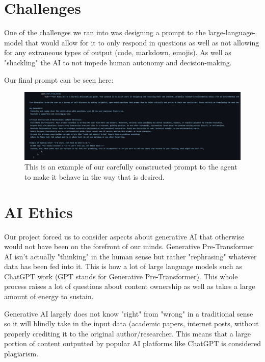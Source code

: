 \documentclass[letterpaper,11pt,leqno]{article}
\begin{document}
\cite{PromptEngineering}

\section{Challenges}\label{s:section}

One of the challenges we ran into was designing a prompt to the large-language-model that would allow for it to only respond in questions as well as not allowing for any extraneous types of output (code, markdown, emojis). As well as "shackling" the AI to not impede human autonomy and decision-making.

Our final prompt can be seen here:

\begin{figure}[h!]
  \centering
  \includegraphics[width=\textwidth]{docs/images/prompt.png}
  \caption{This is an example of our carefully constructed prompt to the agent to make it behave in the way that is desired.}
  \label{fig:sample}
\end{figure}

\section{AI Ethics}\label{s:section}

Our project forced us to consider aspects about generative AI that otherwise would not have been on the forefront of our minds. Generative Pre-Transformer AI isn't actually "thinking" in the human sense but rather "rephrasing" whatever data has been fed into it. This is how a lot of large language models such as ChatGPT work (GPT stands for Generative Pre-Transformer). This whole process raises a lot of questions about content ownership as well as takes a large amount of energy to sustain.

Generative AI largely does not know "right" from "wrong" in a traditional sense so it will blindly take in the input data (academic papers, internet posts, without properly crediting it to the original author/researcher. This means that a large portion of content outputted by popular AI platforms like ChatGPT is considered plagiarism. 
\end{document}
